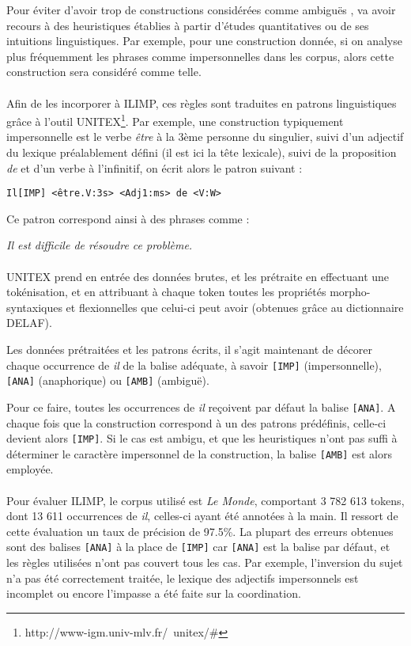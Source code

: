 \documentclass[a4paper,12pt]{article}
\begin{document}
Pour éviter d'avoir trop de constructions considérées comme \og ambiguës \fg{}, \citeauthor{danlos-ilimp-taln2005} va avoir recours à des heuristiques établies à partir d'études quantitatives ou de ses intuitions linguistiques. Par exemple, pour une construction donnée, si on analyse plus fréquemment les phrases comme impersonnelles dans les corpus, alors cette construction sera considéré comme telle.

\paragraph*{}
Afin de les incorporer à ILIMP, ces règles sont traduites en patrons linguistiques grâce à l'outil UNITEX\footnote{http://www-igm.univ-mlv.fr/~unitex/\#}. Par exemple, une construction typiquement impersonnelle est le verbe \og \textit{être} \fg{} à la 3ème personne du singulier, suivi d'un adjectif du lexique préalablement défini (il est ici la tête lexicale), suivi de la proposition \og \textit{de} \fg{} et d'un verbe à l'infinitif, on écrit alors le patron suivant :

\verb!Il[IMP] <être.V:3s> <Adj1:ms> de <V:W>!

Ce patron correspond ainsi à des phrases comme :

\textit{Il est difficile de résoudre ce problème.}

\paragraph{}
UNITEX prend en entrée des données brutes, et les prétraite en effectuant une tokénisation, et en attribuant à chaque token toutes les propriétés morpho-syntaxiques et flexionnelles que celui-ci peut avoir (obtenues grâce au dictionnaire DELAF).

Les données prétraitées et les patrons écrits, il s'agit maintenant de décorer chaque occurrence de \og \textit{il} \fg{} de la balise adéquate, à savoir \verb![IMP]! (impersonnelle),  \verb![ANA]! (anaphorique) ou \verb![AMB]! (ambiguë).

Pour ce faire, toutes les occurrences de \og \textit{il} \fg{} reçoivent par défaut la balise \verb![ANA]!. A chaque fois que la construction correspond à un des patrons prédéfinis, celle-ci devient alors \verb![IMP]!. Si le cas est ambigu, et que les heuristiques n'ont pas suffi à déterminer le caractère impersonnel de la construction, la balise \verb![AMB]! est alors employée.

\paragraph*{}
Pour évaluer ILIMP, le corpus utilisé est \emph{Le Monde}, comportant 3 782 613 tokens, dont 13 611 occurrences de \og{}\textit{il}\fg{}, celles-ci ayant été annotées à la main. Il ressort de cette évaluation un taux de précision de 97.5\%. La plupart des erreurs obtenues sont des balises \verb![ANA]! à la place de \verb![IMP]! car \verb![ANA]! est la balise par défaut, et les règles utilisées n'ont pas couvert tous les cas. Par exemple, l'inversion du sujet n'a pas été correctement traitée, le lexique des adjectifs impersonnels est incomplet ou encore l'impasse a été faite sur la coordination.
\end{document}
